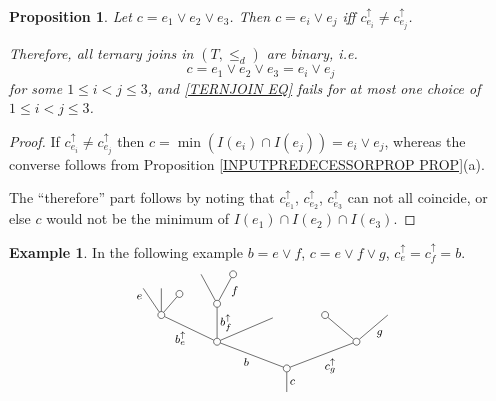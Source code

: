 \documentclass[a4paper,10pt
,draft
]{article}%
\numberwithin{equation}{section}
\numberwithin{figure}{section}
\newtheorem{proposition}[equation]{Proposition}%
\theoremstyle{definition} %
\newtheorem{example}[equation]{Example}%
\newcommand{\1}{\ensuremath{\mathbbm 1}}%
\begin{document}
\begin{proposition}
\label{TERNARYJOIN PROP}
Let $c = e_1 \vee e_2 \vee e_3$.
Then $c = e_i \vee e_j$ iff $c^{\uparrow}_{e_i} \neq c^{\uparrow}_{e_j}$.

Therefore, all ternary joins in $(T,\leq_d)$ are binary, i.e.
\begin{equation}\label{TERNJOIN EQ}
	c = e_1 \vee e_2 \vee e_3 = e_i \vee e_j
\end{equation}
for some $1\leq i <j \leq 3$, and
\eqref{TERNJOIN EQ} fails for 
 at most one choice of $1\leq i <j \leq 3$.
\end{proposition}


\begin{proof}
If $c^{\uparrow}_{e_i} \neq c^{\uparrow}_{e_j}$ then
$c = \min\left(I(e_i) \cap I(e_j)\right) = e_i \vee e_j$, whereas the converse follows from Proposition \ref{INPUTPREDECESSORPROP PROP}(a).

The ``therefore'' part follows by noting that 
$c^{\uparrow}_{e_1}$, $c^{\uparrow}_{e_2}$, $c^{\uparrow}_{e_3}$
can not all coincide, or else $c$ would not be the minimum of
$I(e_1) \cap I(e_2) \cap I(e_3)$. 
\end{proof}


\begin{example} In the following example $b = e \vee f$, $c = e \vee f \vee g$, $c^{\uparrow}_e= c^{\uparrow}_f =b$.
\[
	\begin{tikzpicture}[grow=up,auto,level distance=1.9em,
	every node/.style = {font=\footnotesize,inner sep=2pt},
	dummy/.style={circle,draw,inner sep=0pt,minimum size=1.75mm}]
		\node at (0,0) {}
			child{node [dummy] {}
				child[sibling distance = 10em]{node [dummy] {}
					child[sibling distance = 4.5em]{
					edge from parent node [swap] {$g$}}
					child[sibling distance = 4.5em]{node [dummy] {}}
				edge from parent node [swap] {$c_g^{\uparrow}$}}
				child[sibling distance = 10em]{node [dummy] {}
					child[sibling distance = 4em,level distance=1.7em]
					child[sibling distance = 1.5em,level distance=2.7em]{node [dummy] {}
						child[level distance=2.1em,sibling distance = 2.3em]{node [dummy] {}
						edge from parent node [near end,swap] {$f$}}		
						child[level distance=2.1em,sibling distance = 2.3em]{
						edge from parent node [near end] {}}
					edge from parent node [swap] {$b^{\uparrow}_{f}$}}
					child[sibling distance = 4em]{node [dummy] {}
						child[sibling distance =1.3em, level distance = 1.5 em]{node [dummy]  {}
						edge from parent node [swap] {}}
						child[sibling distance = 1.3em]{
						edge from parent node [very near end,swap] {}}
						child[sibling distance =1.3em]{
						edge from parent node [very near end] {$e$}}
					edge from parent node {$b^{\uparrow}_e$}}
				edge from parent node {$b$}}
			edge from parent node [swap] {$c$}};
	\end{tikzpicture}
\]
\end{example}
\end{document}
